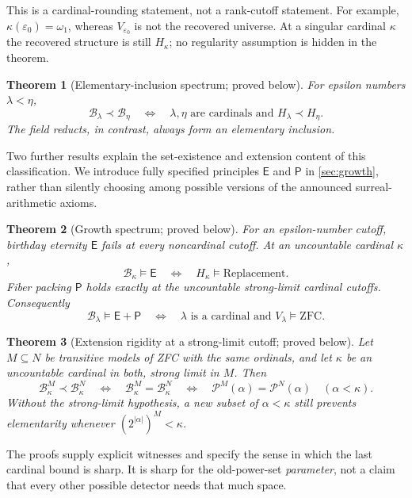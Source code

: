 \documentclass[11pt,letterpaper]{article}
\newtheorem{theorem}{Theorem}[section]
\theoremstyle{definition}
\theoremstyle{remark}
\newcommand{\B}{\mathcal B}
\newcommand{\Etern}{\mathsf E}
\newcommand{\Pack}{\mathsf P}
\newcommand{\Pow}{\mathcal P}
\newcommand{\card}[1]{\lvert#1\rvert}
\begin{document}
This is a cardinal-rounding statement, not a rank-cutoff statement.
For example, $\kappa(\varepsilon_0)=\omega_1$, whereas
$V_{\varepsilon_0}$ is not the recovered universe. At a singular cardinal
$\kappa$ the recovered structure is still $H_\kappa$; no regularity assumption
is hidden in the theorem.

\begin{theorem}[Elementary-inclusion spectrum; proved below]
\label{thm:main-elementary}
For epsilon numbers $\lambda<\eta$,
\[
 \B_\lambda\prec\B_\eta
 \quad\Longleftrightarrow\quad
 \lambda,\eta\text{ are cardinals and }H_\lambda\prec H_\eta.
\]
The field reducts, in contrast, always form an elementary inclusion.
\end{theorem}

Two further results explain the set-existence and extension content of this
classification. We introduce fully specified principles $\Etern$ and $\Pack$
in \cref{sec:growth}, rather than silently choosing among possible versions of
the announced surreal-arithmetic axioms.

\begin{theorem}[Growth spectrum; proved below]
\label{thm:main-growth}
For an epsilon-number cutoff, birthday eternity $\Etern$ fails at every
noncardinal cutoff. At an uncountable cardinal $\kappa$,
\[
 \B_\kappa\models\Etern
 \quad\Longleftrightarrow\quad
 H_\kappa\models\text{Replacement}.
\]
Fiber packing $\Pack$ holds exactly at the uncountable strong-limit cardinal
cutoffs. Consequently
\[
 \B_\lambda\models\Etern+\Pack
 \quad\Longleftrightarrow\quad
 \lambda\text{ is a cardinal and }V_\lambda\models\mathrm{ZFC}.
\]
\end{theorem}

\begin{theorem}[Extension rigidity at a strong-limit cutoff; proved below]
\label{thm:main-extension}
Let $M\subseteq N$ be transitive models of ZFC with the same ordinals, and let
$\kappa$ be an uncountable cardinal in both, strong limit in $M$. Then
\[
 \B_\kappa^M\prec\B_\kappa^N
 \quad\Longleftrightarrow\quad
 \B_\kappa^M=\B_\kappa^N
 \quad\Longleftrightarrow\quad
 \Pow^M(\alpha)=\Pow^N(\alpha)\quad(\alpha<\kappa).
\]
Without the strong-limit hypothesis, a new subset of $\alpha<\kappa$ still
prevents elementarity whenever $(2^{\card\alpha})^M<\kappa$.
\end{theorem}

The proofs supply explicit witnesses and specify the sense in which the last
cardinal bound is sharp. It is sharp for the old-power-set \emph{parameter},
not a claim that every other possible detector needs that much space.
\end{document}
